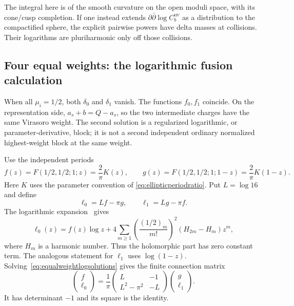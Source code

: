 \documentclass[11pt,a4paper]{article}
\numberwithin{equation}{section}
\theoremstyle{definition}
\theoremstyle{remark}
\begin{document}
The integral here is of the smooth curvature on the open
moduli space, with its cone/cusp completion. If one instead
extends $\partial\bar\partial\log C_b^{\mathrm{uv}}$ as a
distribution to the compactified sphere, the explicit
pairwise powers have delta masses at collisions. Their
logarithms are pluriharmonic only off those collisions.

\subsection{Four equal weights: the logarithmic fusion calculation}

When all $\mu_i=1/2$, both $\delta_0$ and $\delta_1$ vanish.
The functions $f_0,f_1$ coincide. On the representation side,
$a_s+b=Q-a_s$, so the two intermediate charges have the
same Virasoro weight. The second solution is a regularized
logarithmic, or parameter-derivative, block; it is not a
second independent ordinary normalized highest-weight block
at the same weight.

Use the independent periods
\begin{equation}
 f(z)=F(1/2,1/2;1;z)=\frac2\pi K(z),\qquad
 g(z)=F(1/2,1/2;1;1-z)=\frac2\pi K(1-z).
 \label{eq:equalweightfg}
\end{equation}
Here $K$ uses the parameter convention of
\eqref{eq:ellipticperiodratio}. Put $L=\log16$ and define
\begin{equation}
 \ell_0=Lf-\pi g,\qquad \ell_1=Lg-\pi f.
 \label{eq:equalweightlogsolutions}
\end{equation}
The logarithmic expansion~\cite[Sections~15.10 and 19.12]{DLMF}
gives
\[
 \ell_0(z)=f(z)\log z+
   4\sum_{m\ge1}
    \left(\frac{(1/2)_m}{m!}\right)^2
       (H_{2m}-H_m)z^m,
\]
where $H_m$ is a harmonic number. Thus the holomorphic part
has zero constant term. The analogous statement for
$\ell_1$ uses $\log(1-z)$.
Solving~\eqref{eq:equalweightlogsolutions} gives the finite
connection matrix
\begin{equation}
 \boxed{\quad
 \begin{pmatrix}f\\\ell_0\end{pmatrix}
 =\frac1\pi
 \begin{pmatrix}L&-1\\L^2-\pi^2&-L\end{pmatrix}
 \begin{pmatrix}g\\\ell_1\end{pmatrix}.
 \quad}
 \label{eq:equalweightlogfusion}
\end{equation}
It has determinant $-1$ and its square is the identity.
\end{document}
